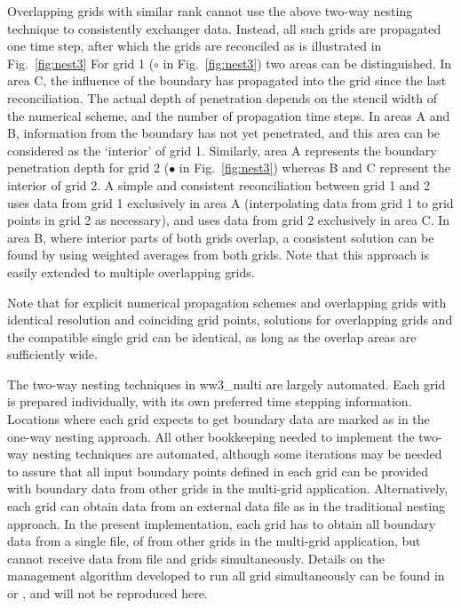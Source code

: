 

Overlapping grids with similar rank cannot use the above two-way nesting
technique to consistently exchanger data. Instead, all such grids are
propagated one time step, after which the grids are reconciled as is
illustrated in Fig.~\ref{fig:nest3} For grid 1 ($\circ$ in
Fig.~\ref{fig:nest3}) two areas can be distinguished. In area C, the influence
of the boundary has propagated into the grid since the last
reconciliation. The actual depth of penetration depends on the stencil width
of the numerical scheme, and the number of propagation time steps.  In areas A
and B, information from the boundary has not yet penetrated, and this area can
be considered as the `interior' of grid 1.  Similarly, area A represents the
boundary penetration depth for grid 2 ($\bullet$ in Fig.~\ref{fig:nest3})
whereas B and C represent the interior of grid 2.  A simple and consistent
reconciliation between grid 1 and 2 uses data from grid 1 exclusively in area
A (interpolating data from grid 1 to grid points in grid 2 as necessary), and
uses data from grid 2 exclusively in area C. In area B, where interior parts
of both grids overlap, a consistent solution can be found by using weighted
averages from both grids. Note that this approach is easily extended to
multiple overlapping grids.

Note that for explicit numerical propagation schemes and overlapping grids with
identical resolution and coinciding grid points, solutions for overlapping
grids and the compatible single grid can be identical, as long as the overlap
areas are sufficiently wide.



\vspace{\baselineskip} 
\noindent 
The two-way nesting techniques in {\file ww3\_multi} are largely automated.
Each grid is prepared individually, with its own preferred time stepping
information. Locations where each grid expects to get boundary data are marked
as in the one-way nesting approach. All other bookkeeping needed to implement
the two-way nesting techniques are automated, although some iterations may be
needed to assure that all input boundary points defined in each grid can be
provided with boundary data from other grids in the multi-grid application.
Alternatively, each grid can obtain data from an external data file as in the
traditional nesting approach. In the present implementation, each grid has to
obtain all boundary data from a single file, of from other grids in the
multi-grid application, but cannot receive data from file and grids
simultaneously. Details on the management algorithm developed to run all grid
simultaneously can be found in \citet[section 3.4]{tol:MMAB07b} or
\cite{tol:OMOD08b}, and will not be reproduced here.

